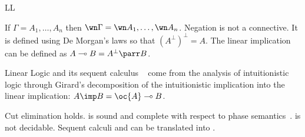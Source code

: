 \begin{entry}{LL}

\begin{clarifications}
If $\Gamma=A_1,\dots,A_n$ then $\wn\Gamma=\wn A_1,\dots,\wn A_n$.
Negation is not a connective. It is defined using De Morgan's laws so that $(A^\bot)^\bot=A$.
The linear implication can be defined as $A\multimap B = A^\bot\parr B$.
\end{clarifications}

\begin{history}
Linear Logic and its sequent calculus \LL~\cite{ll} come from the analysis of intuitionistic logic through Girard's decomposition of the intuitionistic implication into the linear implication: $A\imp B = \oc{A}\multimap B$.
\end{history}

\begin{technicalities}
Cut elimination holds.
\LL{} is sound and complete with respect to phase semantics~\cite{ll}.
\LL{} is not decidable.
Sequent calculi \LK{} and \LJ{} can be translated into \LL.
\end{technicalities}



%
%
%
%
%
%
% 
%




\end{entry}

